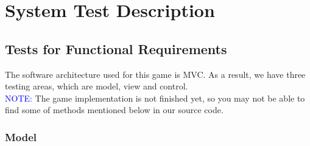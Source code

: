 \documentclass[12pt]{article}
\begin{document}
\section{System Test Description}
\subsection{Tests for Functional Requirements}
The software architecture used for this game is MVC. 
As a result, we have three testing areas, which are 
model, view and control.\\
\textcolor{blue}{NOTE:} The game implementation is not
finished yet, so you may not be able to find some of methods
mentioned below in our source code.
\subsubsection{Model}
\end{document}
